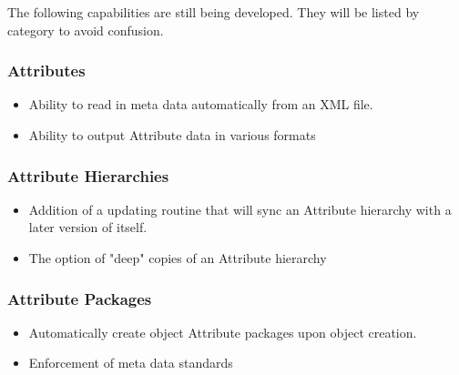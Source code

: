 %

The following capabilities are still being developed.  They will be listed by category to avoid confusion.
 
\subsubsection{Attributes}

\begin{itemize}
\item Ability to read in meta data automatically from an XML file.
\item Ability to output Attribute data in various formats
\end{itemize}

\subsubsection{Attribute Hierarchies}

\begin{itemize}
\item Addition of a updating routine that will sync an Attribute hierarchy with a later version of itself.
\item The option of "deep" copies of an Attribute hierarchy
\end{itemize}

\subsubsection{Attribute Packages}

\begin{itemize}
\item Automatically create object Attribute packages upon object creation.
\item Enforcement of meta data standards
\end{itemize}

